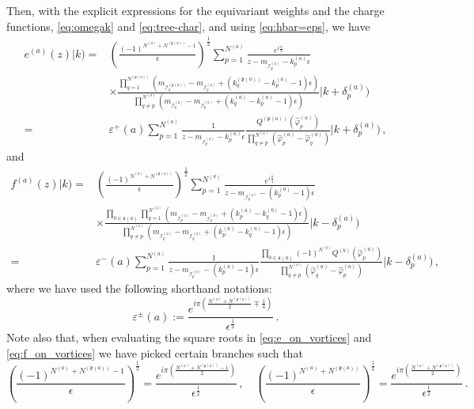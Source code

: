 \documentclass[12pt,a4paper]{article}
\renewcommand{\(}{\left(}
\renewcommand{\)}{\right)}
\renewcommand{\(}{\left(}
\renewcommand{\)}{\right)}
\begin{document}
Then, with the explicit expressions for the equivariant weights and the charge functions, \eqref{eq:omegak} and \eqref{eq:tree-char}, and using \eqref{eq:hbar=eps}, we have
{\small
\begin{equation}\label{eq:e_on_vortices}
    \begin{aligned}
e^{(a)}(z)|k)=&(\frac{(-1)^{N^{(a)}+N^{(\mathfrak{p}(a))}-1}}{\epsilon})^{\frac{1}{2}}\sum_{p=1}^{N^{(a)}}\frac{e^{i\frac{\pi}{4}}}{z-m_{\mathcal{I}^{(a)}_{p}}-k^{(a)}_p \epsilon}\\
 &\times \frac{\prod_{q=1}^{N^{(\mathfrak{p}(a))}}(m_{\mathcal{I}^{(\mathfrak{p}(a))}_{q}}-m_{\mathcal{I}^{(a)}_{p}}+(k^{(\mathfrak{p}(a))}_{q}-k^{(a)}_{p}-1)\epsilon)}{\prod_{q\neq p}^{N^{(a)}}(m_{\mathcal{I}^{(a)}_{q}}-m_{\mathcal{I}^{(a)}_{p}}+(k^{(a)}_{q}-k^{(a)}_{p}-1)\epsilon)}|k+\delta^{(a)}_{p})\\
 =&\varepsilon^+(a)\sum_{p=1}^{N^{(a)}}\frac{1}{z-m_{\mathcal{I}^{(a)}_{p}}-k^{(a)}_p \epsilon}\frac{Q^{(\mathfrak{p}(a))}(\hat{\varphi}^{(a)}_p)}{\prod_{q\neq p}^{N^{(a)}}(\hat{\varphi}^{(a)}_p-\hat{\varphi}^{(a)}_q)} |k+\delta^{(a)}_{p})\,,
\end{aligned}
\end{equation}}
and
{\small
\begin{equation}\label{eq:f_on_vortices}
\begin{aligned}
f^{(a)}(z)|k)=&(\frac{(-1)^{N^{(a)}+N^{(\mathfrak{p}(a))}}}{\epsilon})^{\frac{1}{2}}\sum_{p=1}^{N^{(a)}}\frac{e^{i\frac{\pi}{4}}}{z-m_{\mathcal{I}^{(a)}_{p}}-(k^{(a)}_p-1) \epsilon}\\
&\times \frac{\prod_{b\in \mathfrak{s}(a)}\prod_{q=1}^{N^{(b)}}(m_{\mathcal{I}^{(a)}_{p}}-m_{\mathcal{I}^{(b)}_{q}}+(k^{(a)}_{p}-k^{(b)}_{q}-1)\epsilon)}{\prod_{q\neq p}^{N^{(a)}}(m_{\mathcal{I}^{(a)}_{p}}-m_{\mathcal{I}^{(a)}_{q}}+(k^{(a)}_{p}-k^{(a)}_{q}-1)\epsilon)}|k-\delta^{(a)}_{p})\\
=&\varepsilon^-(a)\sum_{p=1}^{N^{(a)}}\frac{1}{z-m_{\mathcal{I}^{(a)}_{p}}-(k^{(a)}_p-1) \epsilon}  \frac{\prod_{b\in \mathfrak{s}(a)}(-1)^{N^{(b)}}Q^{(b)}(\hat{\varphi}^{(a)}_p)}{\prod_{q\neq p}^{N^{(a)}}(\hat{\varphi}^{(a)}_q-\hat{\varphi}^{(a)}_p)}|k-\delta^{(a)}_{p})\,,
\end{aligned}
\end{equation}}
where we have used the following shorthand notations:
\begin{equation}\label{eq:epsilon+-}
\varepsilon^\pm(a):=\frac{e^{i\pi(\frac{N^{(a)}+N^{(\mathfrak{p}(a))}}{2}\mp\frac{1}{4})}}{\epsilon^{\frac{1}{2}}}\,.
\end{equation}
Note also that, when evaluating the square roots in \eqref{eq:e_on_vortices} and \eqref{eq:f_on_vortices} we have picked certain branches such that
{\small
\begin{equation}
(\frac{(-1)^{N^{(a)}+N^{(\mathfrak{p}(a))}-1}}{\epsilon})^{\frac{1}{2}}=\frac{e^{i\pi(\frac{N^{(a)}+N^{(\mathfrak{p}(a))}-1}{2})}}{\epsilon^{\frac{1}{2}}}\,,\quad  (\frac{(-1)^{N^{(a)}+N^{(\mathfrak{p}(a))}}}{\epsilon})^{\frac{1}{2}}=\frac{e^{i\pi(\frac{N^{(a)}+N^{(\mathfrak{p}(a))}}{2})}}{\epsilon^{\frac{1}{2}}}\,.
\end{equation}}
\end{document}
